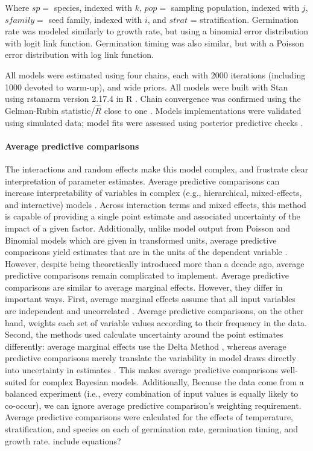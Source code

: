 \documentclass[12pt]{article}\usepackage[]{graphicx}\usepackage[]{color}
\begin{document}
	 Where $sp = $ species, indexed with $k$, $pop =$ sampling population, indexed with $j$, $sfamily =$ seed family, indexed with $i$, and $strat$ = stratification. Germination rate was modeled similarly to growth rate, but using a binomial error distribution with logit link function. Germination timing was also similar, but with a Poisson error distribution with log link function.  
	 	
	All models were estimated using four chains, each with 2000 iterations (including 1000 devoted to warm-up), and wide priors. All models were built with Stan \parencite{Carpenter2017} using rstanarm version 2.17.4 \parencite{Goodrich2018} in R \parencite{Team2015}. Chain convergence was confirmed using the Gelman-Rubin statistic/$\hat{R}$ close to one \parencite{Gelman1992}. Models implementations were validated using simulated data; model fits were assessed using posterior predictive checks \parencite{Gelman2004}.  
	
	\paragraph{Average predictive comparisons} The interactions and random effects make this model complex, and frustrate clear interpretation of parameter estimates. Average predictive comparisons can increase interpretability of variables in complex (e.g., hierarchical, mixed-effects, and interactive) models \parencite{Gelman2007}. Across interaction terms and mixed effects, this method is capable of providing a single point estimate and associated uncertainty of the impact of a given factor. Additionally, unlike model output from Poisson and Binomial models which are given in transformed units, average predictive comparisons yield estimates that are in the units of the dependent variable \parencite{Gelman2007}. However, despite being theoretically introduced more than a decade ago, average predictive comparisons remain complicated to implement. Average predictive comparisons are similar to average marginal effects. However, they differ in important ways. First, average marginal effects assume that all input variables are independent and uncorrelated \parencite{Williams2012}. Average predictive comparisons, on the other hand, weights each set of variable values according to their frequency in the data. Second, the methods used calculate uncertainty around the point estimates differently: average marginal effects use the Delta Method \parencite{Williams2012}, whereas average predictive comparisons merely translate the variability in model draws directly into uncertainty in estimates \parencite{Gelman2007}. This makes average predictive comparisons well-suited for complex Bayesian models. Additionally, Because the data come from a balanced experiment  (i.e., every combination of input values is equally likely to co-occur), we can ignore average predictive comparison's weighting requirement. Average predictive comparisons were calculated for the effects of temperature, stratification, and species on each of germination rate, germination timing, and growth rate. \color{red} include equations? \color{black}
	
\end{document}
